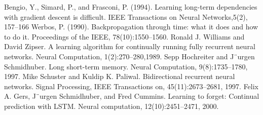 \documentclass[a4paper, openany, oneside, 11pt]{book}
\begin{document}
\begin{thebibliography}{99}
Bengio, Y., Simard, P., and Frasconi, P. (1994). Learning long-term dependencies with gradient descent is
difficult. IEEE Transactions on Neural Networks,5(2), 157–166
Werbos, P. (1990). Backpropagation through time: what it does and how to do it. Proceedings of the
IEEE, 78(10):1550–1560.
Ronald J. Williams and David Zipser. A learning algorithm for continually running fully recurrent neural networks. Neural Computation, 1(2):270–280,1989.
Sepp Hochreiter and J¨urgen Schmidhuber. Long short-term memory. Neural Computation, 9(8):1735–1780, 1997.
Mike Schuster and Kuldip K. Paliwal. Bidirectional recurrent neural networks.
Signal Processing, IEEE Transactions on, 45(11):2673–2681, 1997.
Felix A. Gers, J¨urgen Schmidhuber, and Fred Cummins. Learning to forget:
Continual prediction with LSTM. Neural computation, 12(10):2451–2471,
2000.

\end{thebibliography}
\end{document}
